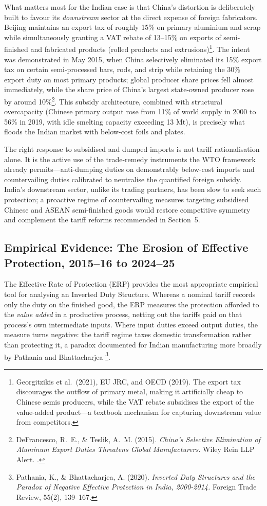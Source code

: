 \documentclass[11pt, a4paper]{article}
\numberwithin{figure}{section}
\numberwithin{table}{section}
\begin{document}
What matters most for the Indian case is that China's distortion is deliberately built to favour its \textit{downstream} sector at the direct expense of foreign fabricators. Beijing maintains an export tax of roughly 15\% on primary aluminium and scrap while simultaneously granting a VAT rebate of 13--15\% on exports of semi-finished and fabricated products (rolled products and extrusions)\footnote{Georgitzikis et al.~(2021), EU JRC, and OECD (2019). The export tax discourages the outflow of primary metal, making it artificially cheap to Chinese semis producers, while the VAT rebate subsidises the export of the value-added product—a textbook mechanism for capturing downstream value from competitors.}. The intent was demonstrated in May 2015, when China selectively eliminated its 15\% export tax on certain semi-processed bars, rods, and strip while retaining the 30\% export duty on most primary products; global producer share prices fell almost immediately, while the share price of China's largest state-owned producer rose by around 10\%\footnote{DeFrancesco, R.~E., \& Teslik, A.~M. (2015). \textit{China's Selective Elimination of Aluminum Export Duties Threatens Global Manufacturers.} Wiley Rein LLP Alert. \cite{wiley2015}.}. This subsidy architecture, combined with structural overcapacity (Chinese primary output rose from 11\% of world supply in 2000 to 56\% in 2019, with idle smelting capacity exceeding 13 Mt), is precisely what floods the Indian market with below-cost foils and plates.

The right response to subsidised and dumped imports is not tariff rationalisation alone. It is the active use of the trade-remedy instruments the WTO framework already permits—anti-dumping duties on demonstrably below-cost imports and countervailing duties calibrated to neutralise the quantified foreign subsidy. India's downstream sector, unlike its trading partners, has been slow to seek such protection; a proactive regime of countervailing measures targeting subsidised Chinese and ASEAN semi-finished goods would restore competitive symmetry and complement the tariff reforms recommended in Section~5.

\subsection{Empirical Evidence: The Erosion of Effective Protection, 2015--16 to 2024--25}
The Effective Rate of Protection (ERP) provides the most appropriate empirical tool for analysing an Inverted Duty Structure. Whereas a nominal tariff records only the duty on the finished good, the ERP measures the protection afforded to the \emph{value added} in a productive process, netting out the tariffs paid on that process's own intermediate inputs. Where input duties exceed output duties, the measure turns negative: the tariff regime taxes domestic transformation rather than protecting it, a paradox documented for Indian manufacturing more broadly by Pathania and Bhattacharjea \cite{pathania2020}\footnote{Pathania, K., \& Bhattacharjea, A. (2020). \textit{Inverted Duty Structures and the Paradox of Negative Effective Protection in India, 2000-2014.} Foreign Trade Review, 55(2), 139--167.}.
\end{document}
